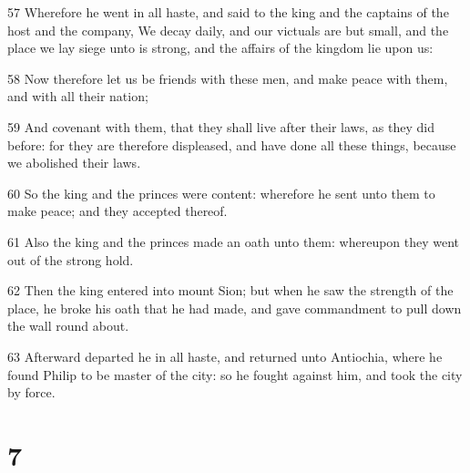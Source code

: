 \par 57 Wherefore he went in all haste, and said to the king and the captains of the host and the company, We decay daily, and our victuals are but small, and the place we lay siege unto is strong, and the affairs of the kingdom lie upon us:
\par 58 Now therefore let us be friends with these men, and make peace with them, and with all their nation;
\par 59 And covenant with them, that they shall live after their laws, as they did before: for they are therefore displeased, and have done all these things, because we abolished their laws.
\par 60 So the king and the princes were content: wherefore he sent unto them to make peace; and they accepted thereof.
\par 61 Also the king and the princes made an oath unto them: whereupon they went out of the strong hold.
\par 62 Then the king entered into mount Sion; but when he saw the strength of the place, he broke his oath that he had made, and gave commandment to pull down the wall round about.
\par 63 Afterward departed he in all haste, and returned unto Antiochia, where he found Philip to be master of the city: so he fought against him, and took the city by force.

\chapter{7}

